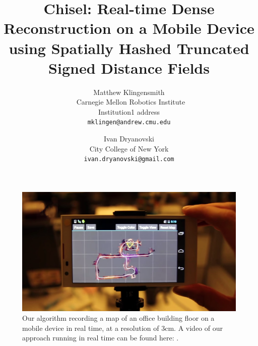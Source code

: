 
\usepackage[pagebackref=true,breaklinks=true,letterpaper=true,colorlinks,bookmarks=false]{hyperref}

 \cvprfinalcopy %

\def\cvprPaperID{****} %
\def\httilde{\mbox{\tt\raisebox{-.5ex}{\symbol{126}}}}

\ifcvprfinal\pagestyle{empty}\fi
 

\title{\Large Chisel: Real-time Dense Reconstruction on a Mobile Device \\
 using Spatially Hashed Truncated Signed Distance Fields }
\author{Matthew Klingensmith \\\
Carnegie Mellon Robotics Institute\\
Institution1 address\\
{\tt\small mklingen@andrew.cmu.edu}
\and
Ivan Dryanovski \\
City College of New York\\
{\tt\small ivan.dryanovski@gmail.com}
}

\maketitle
\begin{figure}
  \centering
    \includegraphics[width=1.0\columnwidth]{img/mapdevice}
      \caption{Our algorithm recording a map of an office building floor on a mobile
  device in real time, at a resolution of 3cm. A video of our approach running
  in real time can be found here: \cite{TangoVideo}.}
  \label{fig:map_device}
\end{figure}



